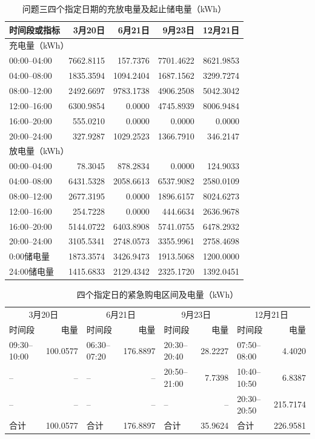 \begin{table}[H]\centering\small
\caption{问题三四个指定日期的充放电量及起止储电量（kWh）}\label{tab:q3-storage-dates}
\begin{tabular}{lrrrr}\toprule
时间段或指标&3月20日&6月21日&9月23日&12月21日\\\midrule
\multicolumn{5}{l}{充电量（kWh）}\\
00:00--04:00&7662.8115&157.7376&7701.4622&8621.9853\\
04:00--08:00&1835.3594&1094.2404&1687.1562&3299.7274\\
08:00--12:00&2492.6697&9783.1738&4906.2508&5042.3042\\
12:00--16:00&6300.9854&0.0000&4745.8939&8006.9484\\
16:00--20:00&555.0210&0.0000&0.0000&0.0000\\
20:00--24:00&327.9287&1029.2523&1366.7910&346.2147\\
\midrule
\multicolumn{5}{l}{放电量（kWh）}\\
00:00--04:00&78.3045&878.2834&0.0000&124.9033\\
04:00--08:00&6431.5328&2058.6613&6537.9082&2580.0109\\
08:00--12:00&2677.3195&0.0000&1896.6157&8024.6273\\
12:00--16:00&254.7228&0.0000&444.6634&2636.9678\\
16:00--20:00&5144.0722&6403.8908&5741.0755&6478.2932\\
20:00--24:00&3105.5341&2748.0573&3355.9961&2758.4698\\
\midrule
0:00储电量&1873.3574&3426.9473&1913.5068&1200.0000\\
24:00储电量&1415.6833&2129.4342&2325.1720&1392.0451\\
\bottomrule\end{tabular}\end{table}
\begin{table}[H]
\centering\small
\renewcommand{\arraystretch}{0.96}
\setlength{\tabcolsep}{2pt}
\caption{四个指定日的紧急购电区间及电量（kWh）}\label{tab:q3-emergency}
\begin{tabular}{@{}lrlrlrlr@{}}
\toprule
\multicolumn{2}{c}{3月20日} & \multicolumn{2}{c}{6月21日} & \multicolumn{2}{c}{9月23日} & \multicolumn{2}{c}{12月21日}\\
时间段 & 电量 & 时间段 & 电量 & 时间段 & 电量 & 时间段 & 电量\\
\midrule
09:30--10:00 & 100.0577 & 06:30--07:20 & 176.8897 & 20:30--20:40 & 28.2227 & 07:50--08:00 & 4.4020\\
-- & -- & -- & -- & 20:50--21:00 & 7.7398 & 10:40--10:50 & 6.8387\\
-- & -- & -- & -- & -- & -- & 20:30--20:50 & 215.7174\\
合计 & 100.0577 & 合计 & 176.8897 & 合计 & 35.9624 & 合计 & 226.9581\\
\bottomrule
\end{tabular}
\end{table}
